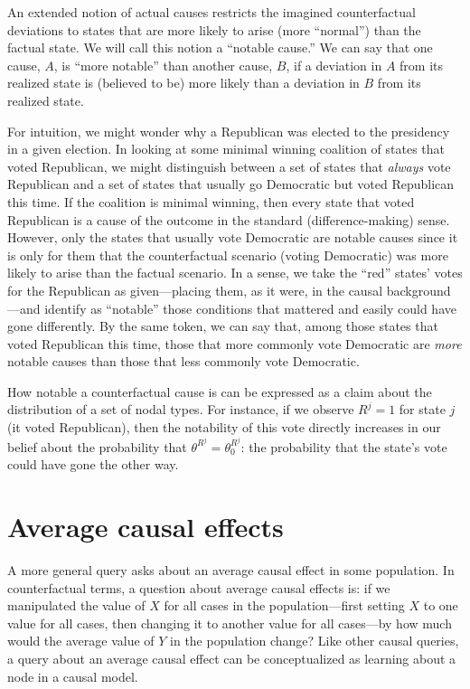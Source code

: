 \documentclass[
  12pt,
]{book}
\begin{document}
An extended notion \citep[p 81]{halpern2016actual} of actual causes restricts the imagined counterfactual deviations to states that are more likely to arise (more ``normal'') than the factual state. We will call this notion a ``notable cause.'' We can say that one cause, \(A\), is ``more notable'' than another cause, \(B\), if a deviation in \(A\) from its realized state is (believed to be) more likely than a deviation in \(B\) from its realized state.

For intuition, we might wonder why a Republican was elected to the presidency in a given election. In looking at some minimal winning coalition of states that voted Republican, we might distinguish between a set of states that \emph{always} vote Republican and a set of states that usually go Democratic but voted Republican this time. If the coalition is minimal winning, then every state that voted Republican is a cause of the outcome in the standard (difference-making) sense. However, only the states that usually vote Democratic are notable causes since it is only for them that the counterfactual scenario (voting Democratic) was more likely to arise than the factual scenario. In a sense, we take the ``red'' states' votes for the Republican as given---placing them, as it were, in the causal background---and identify as ``notable'' those conditions that mattered and easily could have gone differently. By the same token, we can say that, among those states that voted Republican this time, those that more commonly vote Democratic are \emph{more} notable causes than those that less commonly vote Democratic.

How notable a counterfactual cause is can be expressed as a claim about the distribution of a set of nodal types. For instance, if we observe \(R^j=1\) for state \(j\) (it voted Republican), then the notability of this vote directly increases in our belief about the probability that \(\theta^{R^j}=\theta_0^{R^j}\): the probability that the state's vote could have gone the other way.

\hypertarget{average-causal-effects}{%
\section{Average causal effects}\label{average-causal-effects}}

A more general query asks about an average causal effect in some population. In counterfactual terms, a question about average causal effects is: if we manipulated the value of \(X\) for all cases in the population---first setting \(X\) to one value for all cases, then changing it to another value for all cases---by how much would the average value of \(Y\) in the population change? Like other causal queries, a query about an average causal effect can be conceptualized as learning about a node in a causal model.
\end{document}
